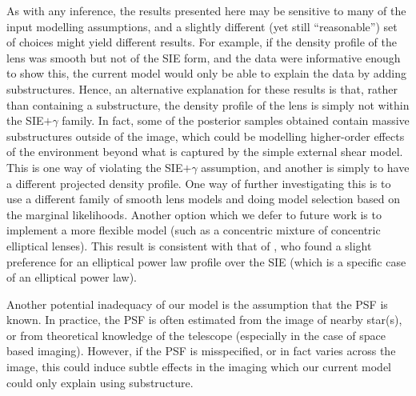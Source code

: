 \documentclass[useAMS,usenatbib]{mn2e}
\begin{document}
As with any inference, the results presented here may be sensitive to many of
the input modelling assumptions, and a slightly different (yet still
``reasonable'') set of choices might yield different results. For example, if
the density profile of the lens was smooth but not of the SIE form, and the
data were informative enough to show this, the current
model would only be able to explain the data by adding substructures. Hence, an alternative explanation for these results is that, rather than containing a substructure, the density profile of the lens is simply not within the SIE$+\gamma$ family. In fact, some of the posterior
samples obtained contain massive substructures outside of the image, which
could be modelling higher-order effects of the environment beyond what is
captured by the simple external shear model. This is one way of violating
the SIE$+\gamma$ assumption, and another is simply to have a different projected
density profile.
One way of further investigating this is to use a different family of
smooth lens models and doing model selection based on the marginal likelihoods.
Another option which we defer to future work is to implement a more flexible
model (such as a concentric mixture of concentric elliptical lenses). This
result is consistent with that of \citet{2008MNRAS.388..384D}, who found a slight preference for an elliptical power law profile over the SIE
(which is a specific case of an elliptical power law).

Another potential inadequacy of our model is the assumption that the PSF is
known. In practice, the PSF is often estimated from the image of nearby star(s),
or from theoretical knowledge of the telescope (especially in the case of
space based imaging). However, if the PSF is misspecified, or in fact varies
across the image, this could induce subtle effects in the imaging which our
current model could only explain using substructure.
\end{document}
